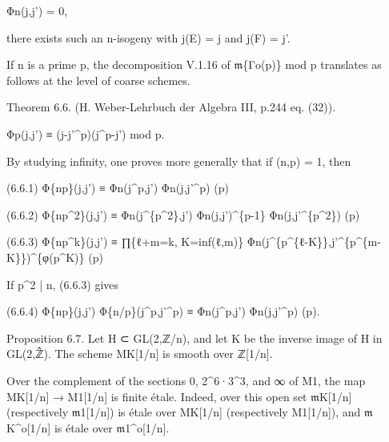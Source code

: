 \documentclass[11pt,a4paper]{article}
\begin{document}
Φ\textunderscore{}n(j,j') = 0,

there exists such an n-isogeny with j(E) = j and j(F) = j'.

If n is a prime p, the decomposition V.1.16 of \ensuremath{\mathfrak{m}}\textunderscore{}\{Γ\textunderscore{}o(p)\} mod p translates as follows at the level of coarse schemes.

Theorem 6.6. (H. Weber-Lehrbuch der Algebra III, p.244 eq. (32)).

Φ\textunderscore{}p(j,j') ≡ (j-j'\textasciicircum{}p)(j\textasciicircum{}p-j') mod p.

By studying infinity, one proves more generally that if (n,p) = 1, then

(6.6.1)        Φ\textunderscore{}\{np\}(j,j') ≡ Φ\textunderscore{}n(j\textasciicircum{}p,j') Φ\textunderscore{}n(j,j'\textasciicircum{}p)        (p)

(6.6.2)        Φ\textunderscore{}\{np\textasciicircum{}2\}(j,j') ≡ Φ\textunderscore{}n(j\textasciicircum{}\{p\textasciicircum{}2\},j') Φ\textunderscore{}n(j,j')\textasciicircum{}\{p-1\} Φ\textunderscore{}n(j,j'\textasciicircum{}\{p\textasciicircum{}2\})        (p)

(6.6.3)        Φ\textunderscore{}\{np\textasciicircum{}k\}(j,j') ≡ ∏\textunderscore{}\{ℓ+m=k, K=inf(ℓ,m)\} Φ\textunderscore{}n(j\textasciicircum{}\{p\textasciicircum{}\{ℓ-K\}\},j'\textasciicircum{}\{p\textasciicircum{}\{m-K\}\})\textasciicircum{}\{φ(p\textasciicircum{}K)\}        (p)

If p\textasciicircum{}2 | n, (6.6.3) gives

(6.6.4)        Φ\textunderscore{}\{np\}(j,j') Φ\textunderscore{}\{n/p\}(j\textasciicircum{}p,j'\textasciicircum{}p) ≡ Φ\textunderscore{}n(j\textasciicircum{}p,j') Φ\textunderscore{}n(j,j'\textasciicircum{}p)        (p).

Proposition 6.7. Let H ⊂ GL(2,ℤ/n), and let K be the inverse image of H in GL(2,ℤ̂). The scheme M\textunderscore{}K[1/n] is smooth over ℤ[1/n].

Over the complement of the sections 0, 2\textasciicircum{}6·3\textasciicircum{}3, and ∞ of M\textunderscore{}1, the map M\textunderscore{}K[1/n] → M\textunderscore{}1[1/n] is finite étale. Indeed, over this open set \ensuremath{\mathfrak{m}}\textunderscore{}K[1/n] (respectively \ensuremath{\mathfrak{m}}\textunderscore{}1[1/n]) is étale over M\textunderscore{}K[1/n] (respectively M\textunderscore{}1[1/n]), and \ensuremath{\mathfrak{m}}\textunderscore{}K\textasciicircum{}o[1/n] is étale over \ensuremath{\mathfrak{m}}\textunderscore{}1\textasciicircum{}o[1/n].
\end{document}
